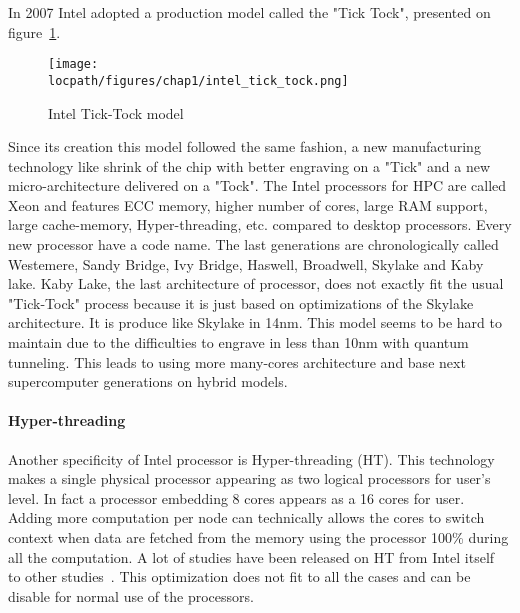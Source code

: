 In 2007 Intel adopted a production model called the "Tick Tock", presented on figure~\ref{fig:1_HPC:intel_tick_tock}.
\begin{figure}[t!]
\begin{center}
\texttt{[image: \\locpath/figures/chap1/intel\_tick\_tock.png]}
\caption{Intel Tick-Tock model}
\label{fig:1_HPC:intel_tick_tock}
\end{center}
\end{figure}
Since its creation this model followed the same fashion, a new manufacturing technology like shrink of the chip with better engraving on a "Tick" and a new micro-architecture delivered on a "Tock".
The Intel processors for HPC are called Xeon and features ECC memory, higher number of cores, large RAM support, large cache-memory, Hyper-threading, etc. compared to desktop processors. 
Every new processor have a code name. 
The last generations are chronologically called Westemere, Sandy Bridge, Ivy Bridge, Haswell, Broadwell, Skylake and Kaby lake. 
Kaby Lake, the last architecture of processor, does not exactly fit the usual "Tick-Tock" process because it is just based on optimizations of the Skylake architecture. 
It is produce like Skylake in 14nm.
This model seems to be hard to maintain due to the difficulties to engrave in less than 10nm with quantum tunneling. 
This leads to using more many-cores architecture and base next supercomputer generations on hybrid models. 

\paragraph{Hyper-threading}
Another specificity of Intel processor is Hyper-threading (HT). 
This technology makes a single physical processor appearing as two logical processors for user's level.
In fact a processor embedding 8 cores appears as a 16 cores for user. 
Adding more computation per node can technically allows the cores to switch context when data are fetched from the memory using the processor 100\% during all the computation. 
A lot of studies have been released on HT from Intel itself~\cite{marr2002hyperthreading} to other studies~\cite{bononi2006exploring,leng2002empirical}.
This optimization does not fit to all the cases and can be disable for normal use of the processors. 

